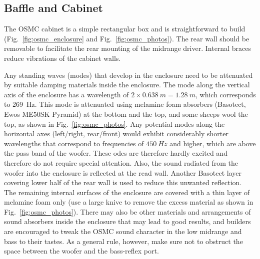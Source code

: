 \documentclass[12pt,a4paper]{article}
\providecommand{\figr}[1]{Fig.~\ref{fig:#1}}
\begin{document}
\subsection{Baffle and Cabinet}
The OSMC cabinet is a simple rectangular box and is straightforward to build (\figr{osmc_enclosure} and \figr{osmc_photos}). The rear wall should be removable to facilitate the rear mounting of the midrange driver. Internal braces reduce vibrations of the cabinet walls.\par

Any standing waves (modes) that develop in the enclosure need to be attenuated by suitable damping materials inside the enclosure. The mode along the vertical axis of the enclosure has a wavelength of $2 \times \SI{0.638}{m} = \SI{1.28}{m}$, which corresponds to \SI{269}{Hz}. This mode is attenuated using melamine foam absorbers (Basotect, Ewos ME50SK Pyramid) at the bottom and the top, and some sheeps wool the top, as shown in \figr{osmc_photos}. Any potential modes along the horizontal axes (left/right, rear/front) would exhibit considerably shorter wavelengths that correspond to frequencies of $\SI{450}{Hz}$ and higher, which are above the pass band of the woofer. These odes are therefore hardly excited and therefore do not require special attention. Also, the sound radiated from the woofer into the enclosure is reflected at the read wall. Another Basotect layer covering lower half of the rear wall is used to reduce this unwanted reflection. The remaining internal surfaces of the enclosure are covered with a thin layer of melamine foam only (use a large knive to remove the excess material as shown in \figr{osmc_photos}). There may also be other materials and arrangements of sound absorbers inside the enclosure that may lead to good results, and builders are encouraged to tweak the OSMC sound character in the low midrange and bass to their tastes. As a general rule, however, make sure not to obstruct the space between the woofer and the bass-reflex port.
\end{document}
